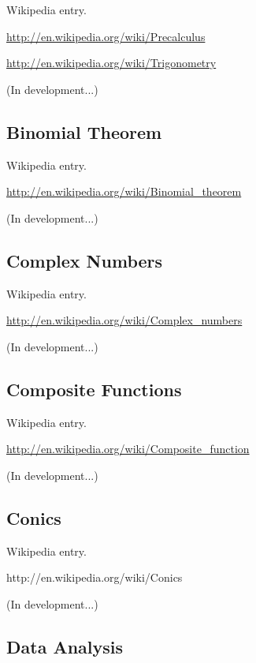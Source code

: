 \documentclass[12pt,twoside]{book}
\begin{document}
Wikipedia entry.

\href{http://en.wikipedia.org/wiki/Precalculus}{http://en.wikipedia.org/wiki/Precalculus}


\bigskip

\href{http://en.wikipedia.org/wiki/Trigonometry}{http://en.wikipedia.org/wiki/Trigonometry}

(In development...)

\subsection[Binomial Theorem]{Binomial Theorem}

Wikipedia entry.

\href{http://en.wikipedia.org/wiki/Binomial_theorem}{http://en.wikipedia.org/wiki/Binomial\_theorem}

(In development...)

\subsection[Complex Numbers]{Complex Numbers}

Wikipedia entry.

\href{http://en.wikipedia.org/wiki/Complex_numbers}{http://en.wikipedia.org/wiki/Complex\_numbers}

(In development...)

\subsection[Composite Functions]{Composite Functions}

Wikipedia entry.

\href{http://en.wikipedia.org/wiki/Composite_function}{http://en.wikipedia.org/wiki/Composite\_function}

(In development...)

\subsection[Conics]{Conics}

Wikipedia entry.

http://en.wikipedia.org/wiki/Conics

(In development...)

\subsection[Data Analysis]{Data Analysis}
\end{document}
